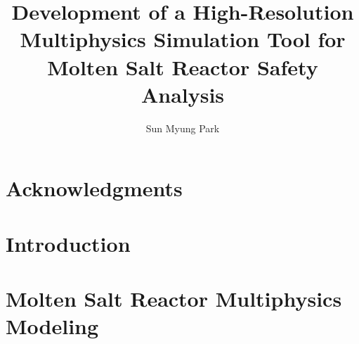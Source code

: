 \documentclass[edeposit,fullpage,11pt]{uiucthesis2018}
\title{Development of a High-Resolution Multiphysics Simulation Tool for Molten
Salt Reactor Safety Analysis}
\author{Sun Myung Park}
\begin{document}
\maketitle

\frontmatter
\begin{abstract}

%

\end{abstract}

\chapter*{Acknowledgments}

%


\tableofcontents
\listoftables
\listoffigures

\printglossary[title=List of Abbreviations,type=\acronymtype,nonumberlist,
nogroupskip=true]

\pagebreak
\mainmatter
\glsresetall

\chapter{Introduction}
\label{chap:intro}

\glsresetall

\chapter{Molten Salt Reactor Multiphysics Modeling}
\label{chap:lit}

\glsresetall
\end{document}
